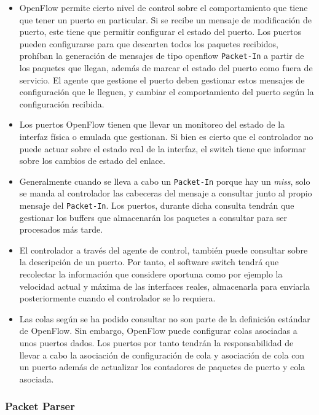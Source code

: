 \begin{itemize}
    \item OpenFlow permite cierto nivel de control sobre el comportamiento que tiene que tener un puerto en particular. Si se recibe un mensaje de modificación de puerto, este tiene que permitir configurar el estado del puerto. Los puertos pueden configurarse para que descarten todos los paquetes recibidos, prohíban la generación de mensajes de tipo openflow \texttt{Packet-In} a partir de los paquetes que llegan, además de marcar el estado del puerto como fuera de servicio. El agente que gestione el puerto deben gestionar estos mensajes de configuración que le lleguen, y cambiar el comportamiento del puerto según la configuración recibida.

    \item Los puertos OpenFlow tienen que llevar un monitoreo del estado de la interfaz física o emulada que gestionan. Si bien es cierto que el controlador no puede actuar sobre el estado real de la interfaz, el switch tiene que informar sobre los cambios de estado del enlace.

    \item  Generalmente cuando se lleva a cabo un \texttt{Packet-In} porque hay un \textit{miss}, solo se manda al controlador las cabeceras del mensaje a consultar junto al propio mensaje del \texttt{Packet-In}. Los puertos, durante dicha consulta tendrán que gestionar los buffers que almacenarán los paquetes a consultar para ser procesados más tarde.

    \item El controlador a través del agente de control, también puede consultar sobre la descripción de un puerto. Por tanto, el software switch tendrá que recolectar la información que considere oportuna como por ejemplo la velocidad actual y máxima de las interfaces reales, almacenarla para enviarla posteriormente cuando el controlador se lo requiera.

    \item Las colas según se ha podido consultar no son parte de la definición estándar de OpenFlow. Sin embargo, OpenFlow puede  configurar colas asociadas a unos puertos dados. Los puertos por tanto tendrán la responsabilidad de llevar a cabo la asociación de configuración de cola y asociación de cola con un puerto además de actualizar los contadores de paquetes de puerto y cola asociada.
\end{itemize}

\subsubsection{Packet Parser}

